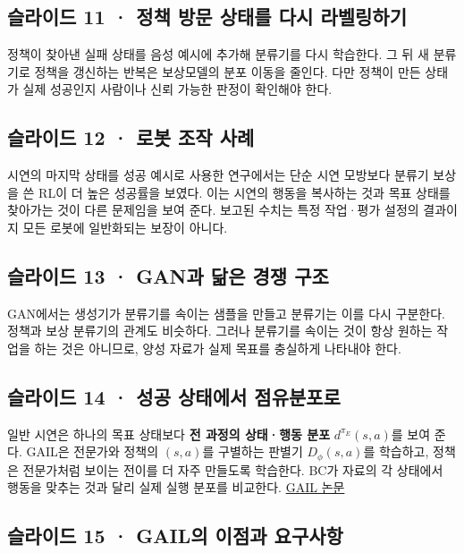 \documentclass[11pt,a4paper]{article}
\begin{document}
\subsection{슬라이드 11 · 정책 방문 상태를 다시 라벨링하기}

정책이 찾아낸 실패 상태를 음성 예시에 추가해 분류기를 다시 학습한다. 그 뒤 새 분류기로 정책을 갱신하는 반복은 보상모델의 분포 이동을 줄인다. 다만 정책이 만든 상태가 실제 성공인지 사람이나 신뢰 가능한 판정이 확인해야 한다.\par

\subsection{슬라이드 12 · 로봇 조작 사례}

시연의 마지막 상태를 성공 예시로 사용한 연구에서는 단순 시연 모방보다 분류기 보상을 쓴 RL이 더 높은 성공률을 보였다. 이는 시연의 행동을 복사하는 것과 목표 상태를 찾아가는 것이 다른 문제임을 보여 준다. 보고된 수치는 특정 작업·평가 설정의 결과이지 모든 로봇에 일반화되는 보장이 아니다.\par

\subsection{슬라이드 13 · GAN과 닮은 경쟁 구조}

GAN에서는 생성기가 분류기를 속이는 샘플을 만들고 분류기는 이를 다시 구분한다. 정책과 보상 분류기의 관계도 비슷하다. 그러나 분류기를 속이는 것이 항상 원하는 작업을 하는 것은 아니므로, 양성 자료가 실제 목표를 충실하게 나타내야 한다.\par

\subsection{슬라이드 14 · 성공 상태에서 점유분포로}

일반 시연은 하나의 목표 상태보다 \textbf{전 과정의 상태·행동 분포} $d^{\pi_E}(s,a)$를 보여 준다. GAIL은 전문가와 정책의 $(s,a)$를 구별하는 판별기 $D_\phi(s,a)$를 학습하고, 정책은 전문가처럼 보이는 전이를 더 자주 만들도록 학습한다. BC가 자료의 각 상태에서 행동을 맞추는 것과 달리 실제 실행 분포를 비교한다. \href{https://arxiv.org/abs/1606.03476}{GAIL 논문}\par

\subsection{슬라이드 15 · GAIL의 이점과 요구사항}
\end{document}
